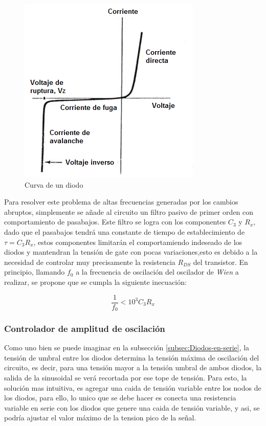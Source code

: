 \begin{figure}[h]
\begin{centering}
\includegraphics[scale=0.5]{../Ex1/Resources/Diodo}
\par\end{centering}
\caption{Curva de un diodo}
\label{1_6}

\end{figure}

Para resolver este problema de altas frecuencias generadas por los
cambios abruptos, simplemente se añade al circuito un filtro pasivo
de primer orden con comportamiento de pasabajos. Este filtro se logra
con los componentes $C_{3}$ y $R_{x}$, dado que el pasabajos tendrá
una constante de tiempo de establecimiento de $\tau=C_{3}R_{x}$,
estos componentes limitarán el comportamiendo indeseado de los diodos
y mantendran la tensión de gate con pocas variaciones,esto es debido
a la necesidad de controlar muy precisamente la resistencia $R_{DS}$
del transistor. En principio, llamando $f_{0}$ a la frecuencia de
oscilación del oscilador de \emph{Wien }a realizar, se propone que
se cumpla la siguiente inecuación:

\begin{equation}
\frac{1}{f_{0}}<10^{3}C_{3}R_{x}\label{eq:1_3}
\end{equation}

\subsubsection{Controlador de amplitud de oscilación}

Como uno bien se puede imaginar en la subsección \ref{subsec:Diodos-en-serie},
la tensión de umbral entre los diodos determina la tensión máxima
de oscilación del circuito, es decir, para una tensión mayor a la
tensión umbral de ambos diodos, la salida de la sinusoidal se verá
recortada por ese tope de tensión. Para esto, la solución mas intuitiva,
es agregar una caida de tensión variable entre los nodos de los diodos,
para ello, lo unico que se debe hacer es conecta una resistencia variable
en serie con los diodos que genere una caida de tensión variable,
y asi, se podría ajustar el valor máximo de la tension pico de la
señal.

